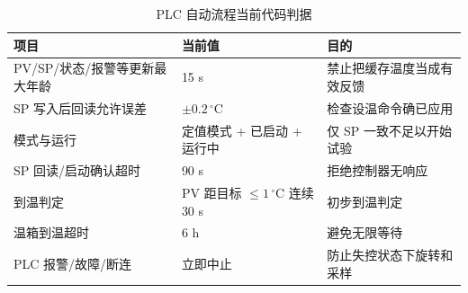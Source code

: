 \begin{table}[H]\centering\small
\caption{PLC 自动流程当前代码判据}
\noindent\begin{tabularx}{\linewidth}{@{}Yp{41mm}Y@{}}\toprule
项目 & 当前值 & 目的\\\midrule
PV/SP/状态/报警等更新最大年龄 & 15 s & 禁止把缓存温度当成有效反馈\\
SP 写入后回读允许误差 & $\pm0.2\, ^\circ\mathrm C$ & 检查设温命令确已应用\\
模式与运行 & 定值模式 + 已启动 + 运行中 & 仅 SP 一致不足以开始试验\\
SP 回读/启动确认超时 & 90 s & 拒绝控制器无响应\\
到温判定 & PV 距目标 $\le1\, ^\circ\mathrm C$ 连续 30 s & 初步到温判定\\
温箱到温超时 & 6 h & 避免无限等待\\
PLC 报警/故障/断连 & 立即中止 & 防止失控状态下旋转和采样\\\bottomrule\end{tabularx}\end{table}
